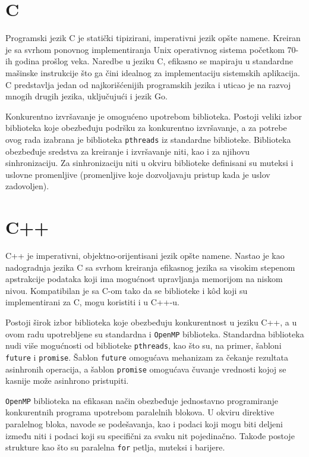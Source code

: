 \documentclass[12pt,oneside]{memoir}
\begin{document}
\section{C}

Programski jezik C je statički tipizirani, imperativni jezik opšte namene. Kreiran je sa svrhom ponovnog implementiranja Unix operativnog sistema početkom 70-ih godina prošlog veka. Naredbe u jeziku C, efikasno se mapiraju u standardne mašinske instrukcije što ga čini idealnog za implementaciju sistemskih aplikacija. C predstavlja jedan od najkorišćenijih programskih jezika i uticao je na razvoj mnogih drugih jezika, uključujući i jezik Go. 

Konkurentno izvršavanje je omogućeno upotrebom biblioteka. Postoji veliki izbor biblioteka koje obezbeđuju podršku za konkurentno izvršavanje, a za potrebe ovog rada izabrana je biblioteka \texttt{pthreads} \cite{pthr} iz standardne biblioteke. Biblioteka obezbeđuje sredstva za kreiranje i izvršavanje niti, kao i za njihovu sinhronizaciju. Za sinhronizaciju niti u okviru biblioteke definisani su muteksi i uslovne promenljive (promenljive koje dozvoljavaju pristup kada je uslov zadovoljen). 

\section{C++}

C++ je imperativni, objektno-orijentisani jezik opšte namene. Nastao je kao nadogradnja jezika C sa svrhom kreiranja efikasnog jezika sa visokim stepenom apstrakcije podataka koji ima mogućnost upravljanja memorijom na niskom nivou. Kompatibilan je sa C-om tako da se biblioteke i k\^{o}d koji su implementirani za C, mogu koristiti i u C++-u.

Postoji širok izbor biblioteka koje obezbeđuju konkurentnost u jeziku C++, a u ovom radu upotrebljene su standardna i \texttt{OpenMP} biblioteka. Standardna biblioteka \cite{std} nudi više mogućnosti od biblioteke \texttt{pthreads}, kao što su, na primer, šabloni \texttt{future} i \texttt{promise}. Šablon \texttt{future} omogućava mehanizam za čekanje rezultata asinhronih operacija, a šablon \texttt{promise} omogućava čuvanje vrednosti kojoj se kasnije može asinhrono pristupiti. 

\texttt{OpenMP} biblioteka \cite{omp} na efikasan način obezbeđuje jednostavno programiranje konkurentnih programa upotrebom paralelnih blokova. U okviru direktive paralelnog bloka, navode se podešavanja, kao i podaci koji mogu biti deljeni između niti i podaci koji su specifični za svaku nit pojedinačno. Takođe postoje strukture kao što su paralelna \texttt{for} petlja, muteksi i barijere. 
\end{document}
